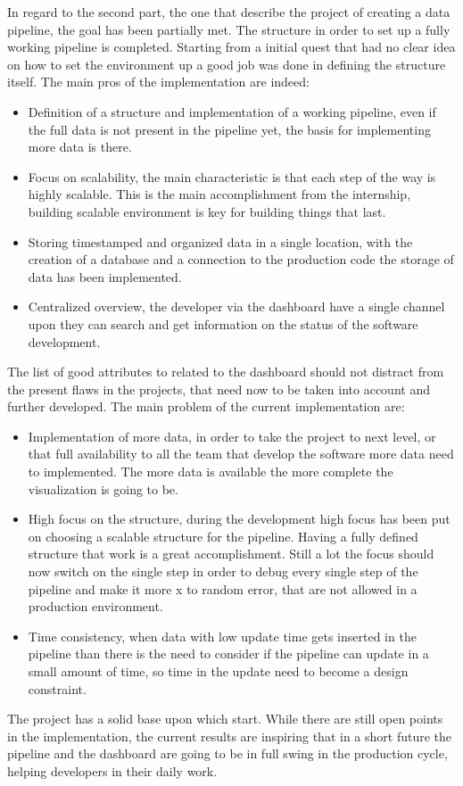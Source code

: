 \documentclass[../main.tex]{subfiles}
\begin{document}
In regard to the second part, the one that describe the project of creating a data pipeline, the goal has been partially met. The structure in order to set up a fully working pipeline is completed. Starting from a initial quest that had no clear idea on how to set the environment up a good job was done in defining the structure itself. The main pros of the implementation are indeed:
\begin{itemize}
    \item Definition of a structure and implementation of a working pipeline, even if the full data is not present in the pipeline yet, the basis for implementing more data is there. 
    \item Focus on scalability, the main characteristic is that each step of the way is highly scalable. This is the main accomplishment from the internship, building scalable environment is key for building things that last.
    \item Storing timestamped and organized data in a single location, with the creation of a database and a connection to the production code the storage of data has been implemented. 
    \item Centralized overview, the developer via the dashboard have a single channel upon they can search and get information on the status of the software development. 
\end{itemize}
The list of good attributes to related to the dashboard should not distract from the present flaws in the projects, that need now to be taken into account and further developed. The main problem of the current implementation are:
\begin{itemize}
    \item Implementation of more data, in order to take the project to next level, or that full availability to all the team that develop the software more data need to implemented. The more data is available the more complete the visualization is going to be.
    \item High focus on the structure, during the development high focus has been put on choosing a scalable structure for the pipeline. Having a fully defined structure that work is a great accomplishment. Still a lot the focus should now switch on the single step in order to debug every single step of the pipeline and make it more x to random error, that are not allowed in a production environment.
    \item Time consistency, when data with low update time gets inserted in the pipeline than there is the need to consider if the pipeline can update in a small amount of time, so time in the update need to become a design constraint. 
\end{itemize}
The project has a solid base upon which start. While there are still open points in the implementation, the current results are inspiring that in a short future the pipeline and the dashboard are going to be in full swing in the production cycle, helping developers in their daily work. 
\cleardoublepage
\end{document}
